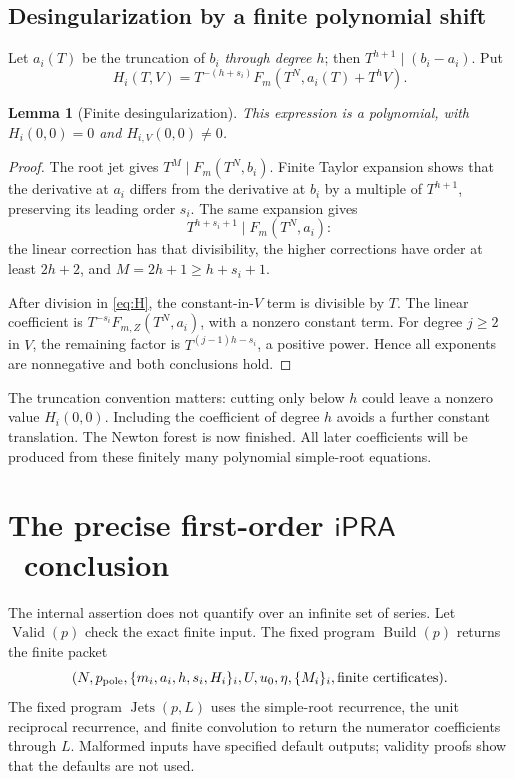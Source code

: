 \documentclass[11pt]{article}
\newtheorem{lemma}[theorem]{Lemma}
\theoremstyle{definition}
\newcommand{\ipra}{\ensuremath{\mathsf{iPRA}}}
\begin{document}
\subsection{Desingularization by a finite polynomial shift}
Let \(a_i(T)\) be the truncation of \(b_i\) \emph{through degree \(h\)};
then \(T^{h+1}\mid(b_i-a_i)\). Put
\begin{equation}
 H_i(T,V)=T^{-(h+s_i)}
       F_m(T^N,a_i(T)+T^hV).
 \label{eq:H}
\end{equation}
\begin{lemma}[Finite desingularization]
\label{lem:desingularization}
This expression is a polynomial, with
\(H_i(0,0)=0\) and \(H_{i,V}(0,0)\ne0\).
\end{lemma}
\begin{proof}
The root jet gives \(T^M\mid F_m(T^N,b_i)\).
Finite Taylor expansion shows that the derivative at \(a_i\) differs from
the derivative at \(b_i\) by a multiple of \(T^{h+1}\), preserving its
leading order \(s_i\). The same expansion gives
\[
 T^{h+s_i+1}\mid F_m(T^N,a_i):
\]
the linear correction has that divisibility, the higher corrections have
order at least \(2h+2\), and \(M=2h+1\ge h+s_i+1\).

After division in \eqref{eq:H}, the constant-in-\(V\) term is divisible
by \(T\). The linear coefficient is
\(T^{-s_i}F_{m,Z}(T^N,a_i)\), with a nonzero constant term.
For degree \(j\ge2\) in \(V\), the remaining factor is
\(T^{(j-1)h-s_i}\), a positive power. Hence all exponents are nonnegative
and both conclusions hold.
\end{proof}
The truncation convention matters: cutting only below \(h\) could leave a
nonzero value \(H_i(0,0)\). Including the coefficient of degree \(h\)
avoids a further constant translation.
The Newton forest is now finished. All later coefficients will be produced
from these finitely many polynomial simple-root equations.



\section{The precise first-order \ipra\ conclusion}
\label{sec:internal}
The internal assertion does not quantify over an infinite set of series.
Let \(\operatorname{Valid}(p)\) check the exact finite input.
The fixed program \(\operatorname{Build}(p)\) returns the finite packet
\[
 (N,p_{\rm pole},\{m_i,a_i,h,s_i,H_i\}_i,
 U,u_0,\eta,\{M_i\}_i,\text{finite certificates}).
\]
The fixed program \(\operatorname{Jets}(p,L)\) uses the simple-root
recurrence, the unit reciprocal recurrence, and finite convolution to return
the numerator coefficients through \(L\). Malformed inputs have specified
default outputs; validity proofs show that the defaults are not used.
\end{document}
